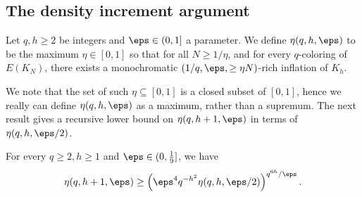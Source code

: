 \subsection{The density increment argument}
\begin{definition}
    Let $q,h \geq 2$ be integers and $\eps \in (0,1]$ a parameter. We define
    $\eta(q,h,\eps)$ to be the maximum $\eta \in [0,1]$ so that for all $N\geq 1/\eta$, and for every $q$-coloring of $E(K_N)$, there exists a monochromatic $(1/q,\eps,\ge \eta N)$-rich inflation of $K_h$.
\end{definition}
We note that the set of such $\eta \subseteq [0,1]$ is a closed subset of $[0,1]$, hence we really can define $\eta(q,h,\eps)$ as a maximum, rather than a supremum. The next result gives a recursive lower bound on $\eta(q,h+1,\eps)$ in terms of $\eta(q,h,\eps/2)$.
\begin{proposition}\label{prop:main increment}
    For every $q\geq 2,h \geq 1$ and $\eps \in (0,\frac 19]$, we have
    \[
    \eta(q,h+1,\eps) \geq \left(\eps^4 q^{-h^2} \eta(q,h,\eps/2)\right)^{q^{6h}/\eps}.
    \]
\end{proposition}

